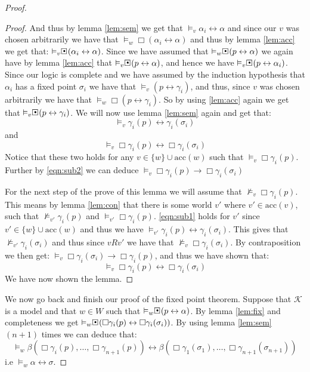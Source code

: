 \documentclass[../main.tex]{subfiles}
\begin{document}
\begin{proof}
\begin{proof}
		And thus by lemma \ref{lem:sem} we get that
		$\vDash_v\alpha_i\leftrightarrow\alpha$ and since our $v$ was
		chosen arbitrarily we have that
		$\vDash_w\Box(\alpha_i\leftrightarrow\alpha)$ and thus by
		lemma \ref{lem:acc} we get that:
		$\vDash_v\sBox(\alpha_i\leftrightarrow\alpha)$. Since we have
		assumed that $\vDash_w\sBox(p\leftrightarrow\alpha)$ we again
		have by lemma \ref{lem:acc} that
		$\vDash_v\sBox(p\leftrightarrow\alpha)$, and hence we have
		$\vDash_v\sBox(p\leftrightarrow\alpha_i)$. Since our logic is
		complete and we have assumed by the induction hypothesis that
		$\alpha_i$ has a fixed point $\sigma_i$ we have that
		$\vDash_v(p\leftrightarrow\gamma_i)$, and thus, since $v$ was
		chosen arbitrarily we have that
		$\vDash_w\Box(p\leftrightarrow\gamma_i)$. So by using
		\ref{lem:acc} again we get that
		$\vDash_v\sBox(p\leftrightarrow\gamma_i)$. We will now use
		lemma \ref{lem:sem} again and get that:
		\begin{equation}
			\label{eqn:sub1}
			\vDash_v\gamma_i(p)\leftrightarrow\gamma_i(\sigma_i)
		\end{equation}
		and
		\begin{equation}
			\label{eqn:sub2}
			\vDash_v\Box\gamma_i(p)\leftrightarrow\Box\gamma_i(\sigma_i)
		\end{equation}
		Notice that these two holds for any $v\in\{w\}\cup\text{acc}(w)$ such that
		$\vDash_v\Box\gamma_i(p)$.
		Further by \ref{eqn:sub2} we can deduce
		$\vDash_v\Box\gamma_i(p)\rightarrow\Box\gamma_i(\sigma_i)$

		For the next step of the prove of this lemma we will assume that
		$\not\vDash_v\Box\gamma_i(p)$. This means by lemma
		\ref{lem:con} that there is some world $v'$ where
		$v'\in\text{acc}(v)$, such that $\not\vDash_{v'}\gamma_i(p)$
		and $\vDash_{v'}\Box\gamma_i(p)$. \ref{eqn:sub1} holds for $v'$
		since $v'\in\{w\}\cup\text{acc}(w)$ and thus we have
		$\vDash_{v'}\gamma_i(p)\leftrightarrow\gamma_i(\sigma_i)$. This
		gives that $\not\vDash_{v'}\gamma_i(\sigma_i)$ and thus since
		$vRv'$ we have that $\not\vDash_v\Box\gamma_i(\sigma_i)$. By
		contraposition we then get:
		$\vDash_v\Box\gamma_i(\sigma_i)\rightarrow\Box\gamma_i(p)$, and
		thus we have shown that:
		$$\vDash_v\Box\gamma_i(p)\leftrightarrow\Box\gamma_i(\sigma_i)$$
		We have now shown the lemma.
	\end{proof}
	We now go back and finish our proof of the fixed point theorem. Suppose
	that $\mathcal{K}$ is a model and that $w\in W$ such that
	$\vDash_w\sBox(p\leftrightarrow\alpha)$. By lemma \ref{lem:fix} and
	completeness we get
	$\vDash_w\sBox(\Box\gamma_i(p)\leftrightarrow\Box\gamma_i(\sigma_i))$.
	By using lemma \ref{lem:sem} $(n+1)$ times we can deduce that:
	$$\vDash_w\beta(\Box\gamma_i(p),\ldots,\Box\gamma_{n+1}(p))\leftrightarrow\beta(
	\Box\gamma_1(\sigma_1),\ldots,\Box\gamma_{n+1}(\sigma_{n+1}))$$
	i.e $\vDash_w\alpha\leftrightarrow\sigma$. 


\end{proof}
\end{document}
